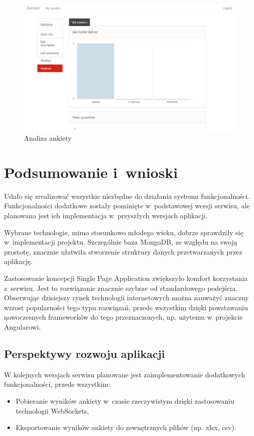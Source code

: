 \documentclass[8pt,a4paper,notitlepage]{article}
\begin{document}
\begin{figure}[H]
    \centering
    \includegraphics[width=\linewidth]{obrazy/analysis}
    \caption{Analiza ankiety}
\end{figure}

\newpage
\section{Podsumowanie i~wnioski}
Udało się zrealizować wszystkie niezbędne do działania systemu funkcjonalności. Funkcjonalności dodatkowe zostały pominięte w~podstawowej wersji serwisu, ale planowana jest ich implementacja w~przyszłych wersjach aplikacji.
\par Wybrane technologie, mimo stosunkowo młodego wieku, dobrze sprawdziły się w~implementacji projektu. Szczególnie baza MongoDB, ze względu na swoją prostotę, znacznie ułatwiła stworzenie struktury danych przetwarzanych przez aplikację. 
\par Zastosowanie koncepcji Single Page Application zwiększyło komfort korzystania z~serwisu. Jest to rozwiązanie znacznie szybsze od standardowego podejścia. Obserwując dzisiejszy rynek technologii internetowych można zauważyć znaczny wzrost popularności tego typu rozwiązań, przede wszystkim dzięki powstawaniu nowoczesnych frameworków do tego przeznaczonych, np. użytemu w~projekcie Angularowi.

\subsection{Perspektywy rozwoju aplikacji}
W kolejnych wersjach serwisu planowane jest zaimplementowanie dodatkowych funkcjonalności, przede wszystkim:
\begin{itemize}
\item Pobieranie wyników ankiety w~czasie rzeczywistym dzięki zastosowaniu technologii WebSockets,
\item Eksportowanie wyników ankiety do zewnętrznych plików (np. xlsx, csv).
\end{itemize}
\end{document}
